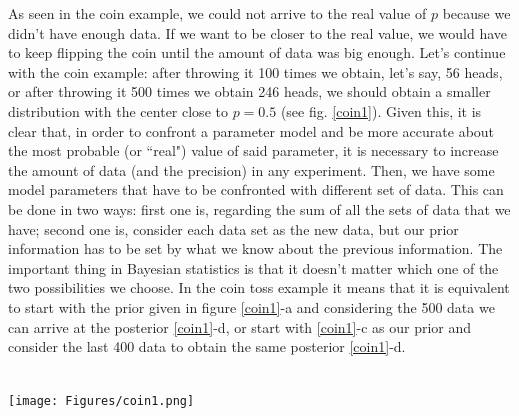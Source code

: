 \documentclass[onecolumn,           %
               showpacs,            %
               preprintnumbers,     %
               aps,                 %
               prl,          	    %
               letterpaper,             %
               superscriptaddress,      %
               nofootinbib,         %
               tightenlines,        %
               floats,floatfix      %
               ,usenatbib,
               ]{revtex4-1}
\begin{document}
As seen in the coin example, we could not arrive to the real value of $p$ because we didn't have enough data. If we want to be closer to the real value, we would have to keep flipping the coin until the amount of data was big enough. Let's continue with the coin example: after throwing it 100 times we obtain, let's say, 56 heads, or after throwing it 500 times we obtain 246 heads, we should obtain a smaller distribution with the center close to $p=0.5$ (see fig. \ref{coin1}). Given this, it is clear that, in order to confront a parameter model and be more accurate about the most probable (or ``real") value of said parameter, it is necessary to increase the amount of data (and the precision) in any experiment. 
Then, we have some model parameters that have to be confronted with different set of data. This can be done in two ways: first one is, regarding the sum of all the sets of data that we have; second one is, consider each data set as the new data, but our prior information has to be set by what we know about the previous information. The important thing in Bayesian statistics is that it doesn't matter which one of the two possibilities we choose. In the coin toss example it means that it is equivalent to start with the prior given in figure \ref{coin1}-a and considering the 500 data we can arrive at the posterior \ref{coin1}-d, or start with \ref{coin1}-c as our prior and consider the last 400 data to obtain the same posterior \ref{coin1}-d. \\ $ $ \\
\begin{minipage}{\textwidth}
\centering
\texttt{[image: Figures/coin1.png]}
\label{coin1}
\end{minipage}
\\$ $ \\
\end{document}
